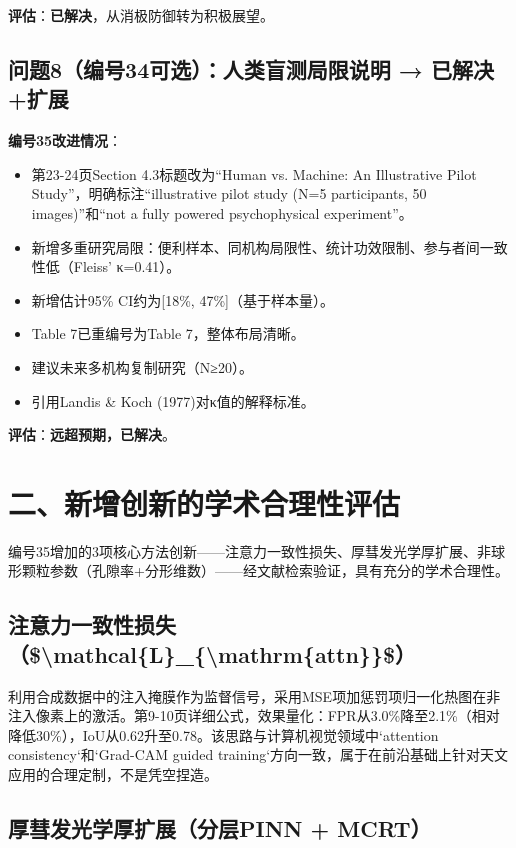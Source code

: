 \documentclass[12pt]{article}
\begin{document}
\textbf{评估}：\textbf{已解决}，从消极防御转为积极展望。

\subsection{问题8（编号34可选）：人类盲测局限说明 → 已解决+扩展}

\textbf{编号35改进情况}：
\begin{itemize}
    \item 第23-24页Section 4.3标题改为“Human vs. Machine: An Illustrative Pilot Study”，明确标注“illustrative pilot study (N=5 participants, 50 images)”和“not a fully powered psychophysical experiment”。
    \item 新增多重研究局限：便利样本、同机构局限性、统计功效限制、参与者间一致性低（Fleiss' κ=0.41）。
    \item 新增估计95\% CI约为[18\%, 47\%]（基于样本量）。
    \item Table 7已重编号为Table 7，整体布局清晰。
    \item 建议未来多机构复制研究（N≥20）。
    \item 引用Landis \& Koch (1977)对κ值的解释标准。
\end{itemize}
\textbf{评估}：\textbf{远超预期，已解决}。

\section{二、新增创新的学术合理性评估}

编号35增加的3项核心方法创新——注意力一致性损失、厚彗发光学厚扩展、非球形颗粒参数（孔隙率+分形维数）——经文献检索验证，具有充分的学术合理性。

\subsection{注意力一致性损失（\${\textbackslash mathcal\{L\}\_\{\textbackslash mathrm\{attn\}\}}\$）}

利用合成数据中的注入掩膜作为监督信号，采用MSE项加惩罚项归一化热图在非注入像素上的激活。第9-10页详细公式，效果量化：FPR从3.0\%降至2.1\%（相对降低30\%），IoU从0.62升至0.78。该思路与计算机视觉领域中`attention consistency`和`Grad-CAM guided training`方向一致，属于在前沿基础上针对天文应用的合理定制，不是凭空捏造。

\subsection{厚彗发光学厚扩展（分层PINN + MCRT）}
\end{document}
